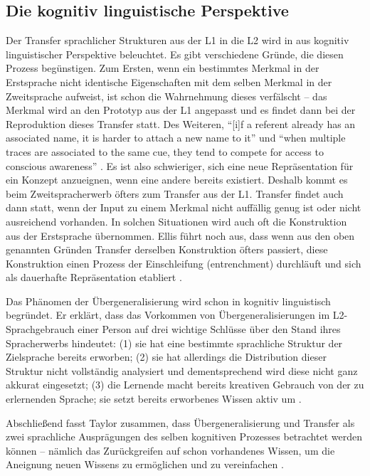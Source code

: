 \subsection{Die kognitiv linguistische Perspektive}
Der Transfer sprachlicher Strukturen aus der L1 in die L2 wird in \cite{Ellis06} aus kognitiv linguistischer Perspektive beleuchtet.
Es gibt verschiedene Gründe, die diesen Prozess begünstigen.
Zum Ersten, wenn ein bestimmtes Merkmal in der Erstsprache nicht identische Eigenschaften mit dem selben Merkmal in der Zweitsprache aufweist, ist schon die Wahrnehmung dieses verfälscht --
das Merkmal wird an den Prototyp aus der L1 angepasst und es findet dann bei der Reproduktion dieses Transfer statt.
Des Weiteren, ``[i]f a referent already has an associated name, it is harder to attach a new name to it'' und
``when multiple traces are associated to the same cue, they tend to compete for access to conscious awareness'' \cite[S.174-176]{Ellis06}.
Es ist also schwieriger, sich eine neue Repräsentation für ein Konzept anzueignen, wenn eine andere bereits existiert.
Deshalb kommt es beim Zweitspracherwerb öfters zum Transfer aus der L1.
Transfer findet auch dann statt, wenn der Input zu einem Merkmal nicht auffällig genug ist oder nicht ausreichend vorhanden.
In solchen Situationen wird auch oft die Konstruktion aus der Erstsprache übernommen.
Ellis führt noch aus, dass wenn aus den oben genannten Gründen Transfer derselben Konstruktion öfters passiert, diese Konstruktion einen Prozess der Einschleifung (entrenchment) durchläuft und sich als dauerhafte Repräsentation etabliert \cite{Ellis06}.

Das Phänomen der Übergeneralisierung wird schon in \cite{Taylor75} kognitiv linguistisch begründet.
Er erklärt, dass das Vorkommen von Übergeneralisierungen im L2-Sprachgebrauch einer Person auf drei wichtige Schlüsse über den Stand ihres Spracherwerbs hindeutet:
(1) sie hat eine bestimmte sprachliche Struktur der Zielsprache bereits erworben;
(2) sie hat allerdings die Distribution dieser Struktur nicht vollständig analysiert und dementsprechend wird diese nicht ganz akkurat eingesetzt;
(3) die Lernende macht bereits kreativen Gebrauch von der zu erlernenden Sprache; sie setzt bereits erworbenes Wissen aktiv um \cite[vgl.][S.74]{Taylor75}.

Abschließend fasst Taylor zusammen, dass Übergeneralisierung und Transfer als zwei sprachliche Ausprägungen des selben kognitiven Prozesses betrachtet werden können --
nämlich das Zurückgreifen auf schon vorhandenes Wissen, um die Aneignung neuen Wissens zu ermöglichen und zu vereinfachen \cite[vgl.][S.87]{Taylor75}.



